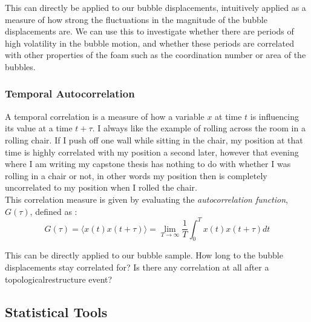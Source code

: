 This can directly be applied to our bubble displacements, intuitively applied as a measure of how strong the fluctuations in the magnitude of the bubble displacements are. We can use this to investigate whether there are periods of high volatility in the bubble motion, and whether these periods are correlated with other properties of the foam such as the coordination number or area of the bubbles.

\subsubsection{Temporal Autocorrelation}
A temporal correlation is a measure of how a variable $x$ at time $t$ is influencing its value at a time $t + \tau$. I always like the example of rolling across the room in a rolling chair. If I push off one wall while sitting in the chair, my position at that time is highly correlated with my position a second later, however that evening where I am writing my capstone thesis has nothing to do with whether I was rolling in a chair or not, in other words my position then is completely uncorrelated to my position when I rolled the chair.\\

This correlation measure is given by evaluating the \textit{autocorrelation function}, $G(\tau)$, defined as \cite{richmond2013econophysics}:
\begin{equation}
    G(\tau) = \langle x(t)x(t+\tau) \rangle = \lim_{T \rightarrow \infty} \frac{1}{T} \int_{0}^{T} x(t)x(t+\tau)dt
\end{equation}

This can be directly applied to our bubble sample. How long to the bubble displacements stay correlated for? Is there any correlation at all after a topologicalrestructure event?



\subsection{Statistical Tools}
